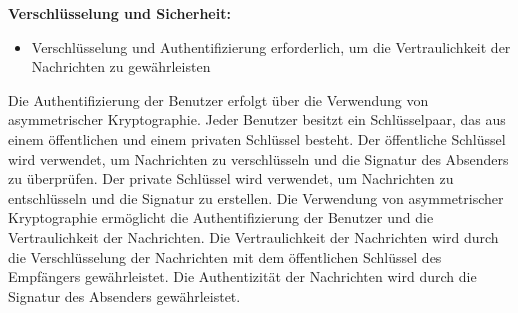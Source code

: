 \noindent \textbf{Verschlüsselung und Sicherheit:}
\begin{itemize}
    \item Verschlüsselung und Authentifizierung erforderlich, um die Vertraulichkeit der Nachrichten zu gewährleisten
\end{itemize}

\noindent Die Authentifizierung der Benutzer erfolgt über die Verwendung von asymmetrischer Kryptographie. Jeder Benutzer besitzt ein Schlüsselpaar, das aus einem öffentlichen und einem privaten Schlüssel besteht. Der öffentliche Schlüssel wird verwendet, um Nachrichten zu verschlüsseln und die Signatur des Absenders zu überprüfen. Der private Schlüssel wird verwendet, um Nachrichten zu entschlüsseln und die Signatur zu erstellen. Die Verwendung von asymmetrischer Kryptographie ermöglicht die Authentifizierung der Benutzer und die Vertraulichkeit der Nachrichten. Die Vertraulichkeit der Nachrichten wird durch die Verschlüsselung der Nachrichten mit dem öffentlichen Schlüssel des Empfängers gewährleistet. Die Authentizität der Nachrichten wird durch die Signatur des Absenders gewährleistet. 
